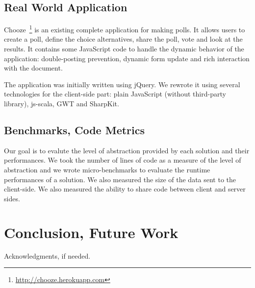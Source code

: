 \documentclass[preprint]{sigplanconf}
\begin{document}
\subsection{Real World Application}

Chooze~\footnote{\href{http://chooze.herokuapp.com}{http://chooze.herokuapp.com}} is an existing complete
application for making polls. It allows users to create a poll, define the choice alternatives, share the poll, vote
and look at the results. It contains some JavaScript code to handle the dynamic behavior of the application:
double-posting prevention, dynamic form update and rich interaction with the document.

The application was initially written using jQuery. We rewrote it using several technologies for the client-side
part: plain JavaScript (without third-party library), js-scala, GWT and SharpKit.

\subsection{Benchmarks, Code Metrics}

Our goal is to evalute the level of abstraction provided by each solution and their performances. We took the
number of lines of code as a measure of the level of abstraction and we wrote micro-benchmarks to evaluate the
runtime performances of a solution. We also measured the size of the data sent to the client-side. We also measured
the ability to share code between client and server sides.

\section{Conclusion, Future Work}
\label{discussion}

%
%
\acks

Acknowledgments, if needed.



%
%
%
\end{document}
